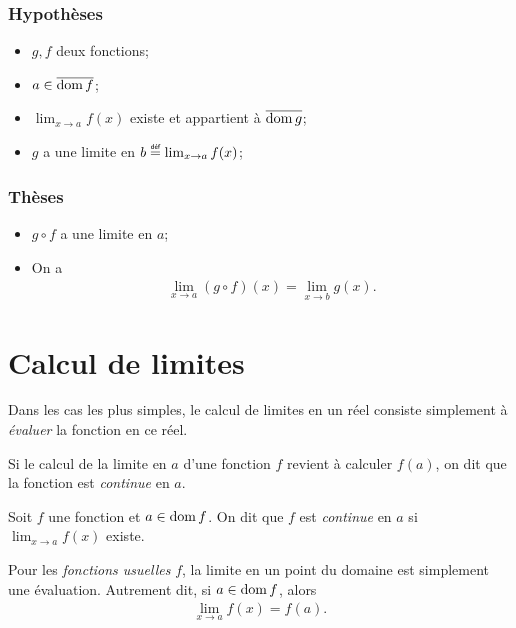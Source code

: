\documentclass[main.tex]{subfiles}
\begin{document}
\begin{proposition}

    \subsubsection{Hypothèses}
    \begin{itemize}
        \item $g, f$ deux fonctions;
        \item $a \in \overline{\operatorname{dom} f}$;
        \item $\lim_{x \to a} f(x)$ existe et appartient à $\overline{\operatorname{dom} g}$;
        \item $g$ a une limite en $b \defeq \lim_{x \to a} f(x)$;
    \end{itemize}

    \subsubsection{Thèses}
    \begin{itemize}
        \item $g \circ f$ a une limite en $a$;
        \item On a
            \begin{align}
                \lim_{x \to a} (g \circ f)(x) = \lim_{x \to b} g(x).
            \end{align}
    \end{itemize}
\end{proposition}

\section{Calcul de limites}

Dans les cas les plus simples,
le calcul de limites en un réel consiste simplement à \emph{évaluer} la fonction en ce réel.

Si le calcul de la limite en $a$ d'une fonction $f$ revient à calculer $f(a)$, on dit que la fonction est \emph{continue} en $a$.

\begin{definition}
    
    Soit $f$ une fonction et $a \in \operatorname{dom} f$.
    On dit que $f$ est \emph{continue} en $a$ 
    si $\lim_{x \to a} f(x)$ existe.
\end{definition}


\begin{proposition}
    Pour les \emph{fonctions usuelles} $f$,
    la limite en un point du domaine est simplement une évaluation.
    Autrement dit,
    si $a \in \operatorname{dom} f$, alors
    \begin{align}
        \lim_{x \to a} f(x) = f(a).
    \end{align}
\end{proposition}
\end{document}
